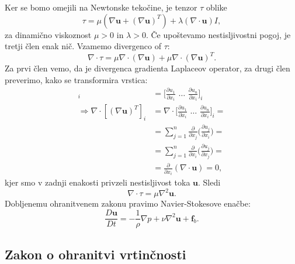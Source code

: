 \documentclass[mat2, tisk]{fmfdelo}
\newcommand{\bd}{\textbf}
\begin{document}
Ker se bomo omejili na Newtonske tekočine, je tenzor $\tau$ oblike 
\begin{equation}
\tau = \mu (\nabla \bd{u} + (\nabla \bd{u})^T) + \lambda (\nabla \cdot \bd{u}) I,
\end{equation}
za dinamično viskoznost $\mu > 0$ in $\lambda > 0$. Če upoštevamo nestisljivostni pogoj, 
je tretji člen enak nič. Vzamemo divergenco of $\tau$:
$$
\nabla \cdot \tau = \mu \nabla \cdot (\nabla\bd{u}) + \mu\nabla \cdot (\nabla \bd{u})^T.
$$
Za prvi člen vemo, da je divergenca gradienta Laplaceov operator, za drugi člen preverimo, kako se transformira vrstica:
\begin{align*}
[(\nabla \bd{u})^T]_i &= \Big[\frac{\partial u_1}{\partial x_i}\,\, \dots \,\, \frac{\partial u_n}{\partial x_i}\Big]_i \\
\Longrightarrow \nabla \cdot [(\nabla \bd{u})^T]_i &= \nabla \cdot \Big[\frac{\partial u_1}{\partial x_i}\,\, \dots \,\, \frac{\partial u_n}{\partial x_i}\Big]_i = \\
&= \sum_{j=1}^n \frac{\partial}{\partial x_j} \Big(\frac{\partial u_j}{\partial x_i}\Big) = \\
&= \sum_{j=1}^n \frac{\partial}{\partial x_i} \Big(\frac{\partial u_j}{\partial x_j}\Big) = \\
&= \frac{\partial}{\partial x_i} (\nabla \cdot \bd{u}) = 0,
\end{align*}
kjer smo v zadnji enakosti privzeli nestisljivost toka $\bd{u}$. 
Sledi
$$
\nabla \cdot \tau = \mu \nabla^2 \bd{u}.
$$
Dobljenemu ohranitvenem zakonu pravimo Navier-Stokesove enačbe:
\begin{equation}
\frac{D \bd{u}}{D t} = -\frac{1}{\rho} \nabla p + \nu \nabla^2 \bd{u} + \bd{f}_b.
\end{equation}


\subsection{Zakon o ohranitvi vrtinčnosti}
\end{document}
